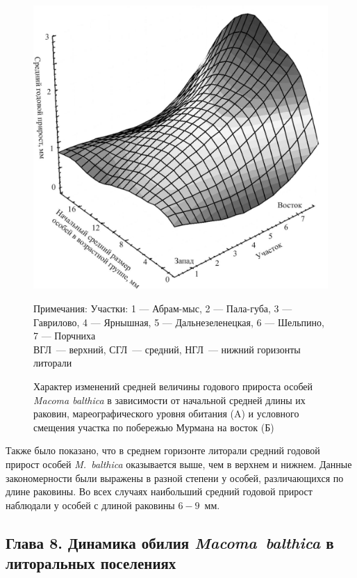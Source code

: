 {\begin{figure}[]
\begin{minipage}[b]{.5\linewidth}
\begin{center}
				\includegraphics[width=\textwidth]{../Barenc_Sea/growth_from_MSc/prirost_otklik_geography.jpg}
			\end{center}
		\end{minipage}
	\caption{Характер изменений средней величины годового прироста особей {\it Macoma balthica} в зависимости от начальной средней длины их раковин, мареографического уровня обитания (A) и условного смещения участка по побережью Мурмана на восток (Б)}
\footnotesize{Примечания: Участки: 1 --- Абрам-мыс, 2 --- Пала-губа, 3 --- Гаврилово, 4 --- Ярнышная, 5 --- Дальнезеленецкая, 6 --- Шельпино, 7 --- Порчниха\\
ВГЛ~--- верхний, СГЛ~--- средний, НГЛ~--- нижний горизонты литорали}
	\label{ris:prirost_otklik}
	\end{figure}
Также было показано, что в среднем горизонте литорали средний годовой прирост особей \textit{M.~balthica} оказывается выше, чем в верхнем и нижнем.
Данные закономерности были выражены в разной степени у особей, различающихся по длине раковины.
Во всех случаях наибольший средний годовой прирост наблюдали у особей с длиной раковины $6 - 9$~мм.



\subsection*{Глава 8. Динамика обилия \textit{Macoma~balthica} в литоральных поселениях}

}
